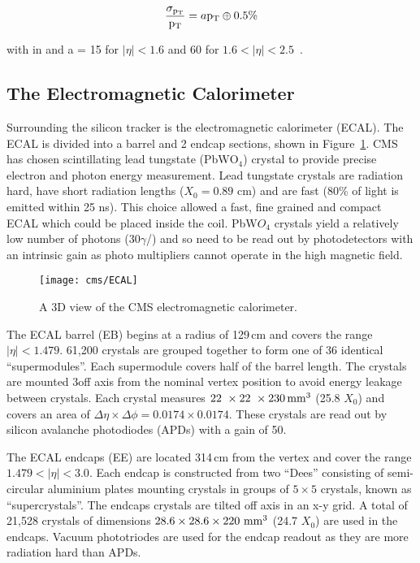 \begin{equation}
\frac{\sigma_{\mathrm{p_{T}}}}{\mathrm{p_{T}}} = a\mathrm{p_{T}} \oplus 0.5\%
\label{eqn:TRK_perf}
\end{equation}

with \PT in \TeV and a = 15 for $|\eta| < 1.6$ and 60 for $1.6 < |\eta| < 2.5$~\cite{CMS_TDR_PHYS_vol1}.

\subsection{The Electromagnetic Calorimeter}
Surrounding the silicon tracker is the electromagnetic calorimeter (ECAL). The ECAL is divided into a barrel and 2 endcap sections, shown in Figure~\ref{fig:ECAL}. CMS has chosen scintillating lead tungstate (PbW$\mathrm{O_{4}}$) crystal to provide precise electron and photon energy measurement. Lead tungstate crystals are radiation hard, have short radiation lengths ($X_{0}=0.89$ cm) and are fast (80\% of light is emitted within 25 ns). This choice allowed a fast, fine grained and compact ECAL which could be placed inside the coil. PbW$O_{4}$ crystals yield a relatively low number of photons (30$\gamma$/\MeV) and so need to be read out by  photodetectors with an intrinsic gain as photo multipliers cannot operate in the high magnetic field.

\begin{figure}[htb]
  \centering
  \texttt{[image: cms/ECAL]}
  \caption{A 3D view of the CMS electromagnetic calorimeter.~\cite{CMS_ECALTDR}}
  \label{fig:ECAL}
\end{figure}

The ECAL barrel (EB) begins at a radius of 129\,cm and covers the range $|\eta| < 1.479$. 61,200 crystals are grouped together to form one of 36 identical ``supermodules''. Each supermodule covers half of the barrel length. The crystals are mounted 3\de off axis from the nominal vertex position to avoid energy leakage between crystals. Each crystal measures $22~\times22~\times230\,\mathrm{mm^{\mathrm{3}}}$ (25.8 $X_{0}$) and covers an area of $\Delta\eta\times\Delta\phi = 0.0174\times0.0174$. These crystals are read out by silicon avalanche photodiodes (APDs) with a gain of 50. 

The ECAL endcaps (EE) are located 314\,cm from the vertex and cover the range $1.479 < |\eta| < 3.0$. Each endcap is constructed from two ``Dees'' consisting of semi-circular aluminium plates mounting crystals in groups of $5\times5$ crystals, known as ``supercrystals''. The endcaps crystals are tilted off axis in an x-y grid. A total of 21,528 crystals of dimensions $28.6\times28.6\times220~\mathrm{mm^{\mathrm{3}}}$ (24.7 $X_{0}$) are used in the endcaps. Vacuum phototriodes are used for the endcap readout as they are more radiation hard than APDs.

